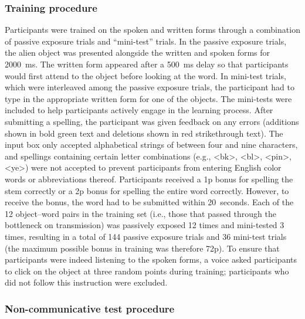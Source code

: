 \documentclass[doc,biblatex]{apa7}
\begin{document}
\subsubsection{Training procedure}

Participants were trained on the spoken and written forms through a combination of passive exposure trials and ``mini-test'' trials. In the passive exposure trials, the alien object was presented alongside the written and spoken forms for 2000~ms. The written form appeared after a 500~ms delay so that participants would first attend to the object before looking at the word. In mini-test trials, which were interleaved among the passive exposure trials, the participant had to type in the appropriate written form for one of the objects. The mini-tests were included to help participants actively engage in the learning process. After submitting a spelling, the participant was given feedback on any errors (additions shown in bold green text and deletions shown in red strikethrough text). The input box only accepted alphabetical strings of between four and nine characters, and spellings containing certain letter combinations (e.g., <bk>, <bl>, <pin>, <ye>) were not accepted to prevent participants from entering English color words or abbreviations thereof. Participants received a 1p bonus for spelling the stem correctly or a 2p bonus for spelling the entire word correctly. However, to receive the bonus, the word had to be submitted within 20~seconds. Each of the 12 object--word pairs in the training set (i.e., those that passed through the bottleneck on transmission) was passively exposed 12 times and mini-tested 3 times, resulting in a total of 144 passive exposure trials and 36 mini-test trials (the maximum possible bonus in training was therefore 72p). To ensure that participants were indeed listening to the spoken forms, a voice asked participants to click on the object at three random points during training; participants who did not follow this instruction were excluded.

\subsubsection{Non-communicative test procedure}
\end{document}
